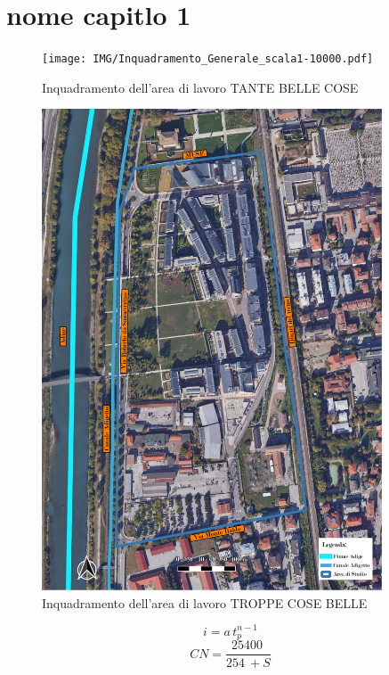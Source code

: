 \chapter{nome capitlo 1}
\begin{figure}[p]
    \centering
    \texttt{[image: IMG/Inquadramento\_Generale\_scala1-10000.pdf]} 
    \caption{Inquadramento dell'area di lavoro  TANTE BELLE COSE}
    \label{fig:inquadramentoGenerale}
\end{figure}
\begin{figure}[p]
    \centering
    \includegraphics[trim=0cm 0cm 0cm 0cm,clip,frame,width=0.9\textwidth]{IMG/Inquadramento_scala1-2800.pdf} 
    \caption{Inquadramento dell'area di lavoro TROPPE  COSE BELLE}
    \label{fig:inquadramentoDettaglio}
\end{figure}

\begin{equation}
    i = a \, t_p ^{n - 1}
\end{equation}
\begin{equation}
    CN = \frac{\SI{25400}{}}{\SI{254}{} + S}
\end{equation}

